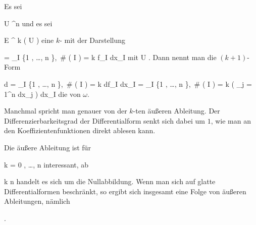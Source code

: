 {}
{

Es sei

\mavergleichskette
{\vergleichskette
{ U
}
{ \subseteq }{ \R^n
}
{  }{
}
{    }{
}
{   }{
}
}
{}{}{}
und es sei

\mavergleichskette
{\vergleichskette
{ \omega
}
{ \in }{
{ \mathcal E }^{ k } (  U   )
}
{  }{
}
{    }{
}
{   }{
}
}
{}{}{}
eine
$k$-
mit der Darstellung

\mavergleichskettedisp
{\vergleichskette
{ \omega
}
{ =} { \sum_{I \subseteq \{1 , \ldots , n \},\, { \# \left(   I  \right) } = k } f_I dx_I
}
{ } {
}
{ } {
}
{ } {
}
}
{}{}{}
mit
 { U } {\R
} {.}
Dann nennt man die $(k+1)$-Form

\mavergleichskettedisp
{\vergleichskette
{d \omega
}
{ =} { \sum_{I \subseteq \{1 , \ldots , n \},\,  { \# \left(   I  \right) } = k } df_I \wedge dx_I
}
{ =} { \sum_{I \subseteq \{1 , \ldots , n \},\,  { \# \left(   I  \right) } = k } \left(  \sum_{j = 1}^n {  } dx_j  \right)  \wedge dx_I
}
{ } {
}
{ } {
}
}
{}{}{}
die  von $\omega$.

}

Manchmal spricht man genauer von der $k$-ten äußeren Ableitung. Der Differenzierbarkeitsgrad der Differentialform senkt sich dabei um $1$, wie man an den Koeffizientenfunktionen direkt ablesen kann.

Die äußere Ableitung ist für

\mavergleichskette
{\vergleichskette
{ k
}
{ = }{ 0 , \ldots , n
}
{  }{
}
{    }{
}
{   }{
}
}
{}{}{}
interessant, ab

\mavergleichskette
{\vergleichskette
{ k
}
{ \geq }{ n
}
{  }{
}
{    }{
}
{   }{
}
}
{}{}{}
handelt es sich um die Nullabbildung. Wenn man sich auf glatte Differentialformen beschränkt, so ergibt sich insgesamt eine Folge von äußeren Ableitungen, nämlich

 { . }

